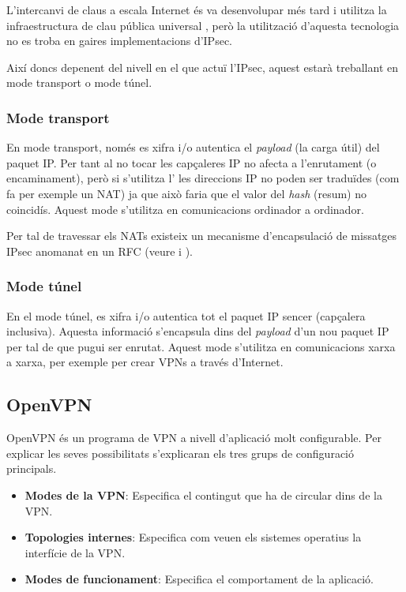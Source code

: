 L'intercanvi de claus a escala Internet és va desenvolupar més tard i utilitza la infraestructura de clau pública universal , però la utilització d'aquesta tecnologia no es troba en gaires implementacions d'IPsec.

Així doncs depenent del nivell en el que actuï l'IPsec, aquest estarà treballant en mode transport o mode túnel.
\subsubsection{Mode transport}
En mode transport, només es xifra i/o autentica el \emph{payload} (la carga útil) del paquet IP. Per tant al no tocar les capçaleres IP no afecta a l'enrutament (o encaminament), però si s'utilitza l' les direccions IP no poden ser traduïdes (com fa per exemple un NAT) ja que això faria que el valor del \emph{hash} (resum) no coincidís. Aquest mode s'utilitza en comunicacions ordinador a ordinador.

Per tal de travessar els NATs existeix un mecanisme d'encapsulació de missatges IPsec anomanat  en un RFC (veure \cite{rfc3715} i \cite{rfc3947}).
\subsubsection{Mode túnel}
En el mode túnel, es xifra i/o autentica tot el paquet IP sencer (capçalera inclusiva). Aquesta informació s'encapsula dins del \emph{payload} d'un nou paquet IP per tal de que pugui ser enrutat. Aquest mode s'utilitza en comunicacions xarxa a xarxa, per exemple per crear VPNs a través d'Internet.

\subsection{OpenVPN}
OpenVPN és un programa de VPN a nivell d'aplicació molt configurable. Per explicar les seves possibilitats s'explicaran els tres grups de configuració principals.
\begin{itemize}
\item \textbf{Modes de la VPN}:
Especifica el contingut que ha de circular dins de la VPN.
\item \textbf{Topologies internes}:
Especifica com veuen els sistemes operatius la interfície de la VPN.
\item \textbf{Modes de funcionament}:
Especifica el comportament de la aplicació.
\end{itemize}

